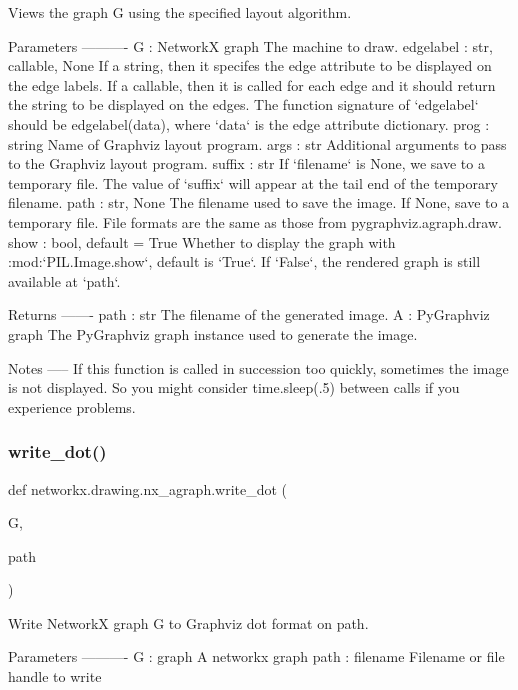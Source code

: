 \begin{DoxyVerb}Views the graph G using the specified layout algorithm.

Parameters
----------
G : NetworkX graph
    The machine to draw.
edgelabel : str, callable, None
    If a string, then it specifes the edge attribute to be displayed
    on the edge labels. If a callable, then it is called for each
    edge and it should return the string to be displayed on the edges.
    The function signature of `edgelabel` should be edgelabel(data),
    where `data` is the edge attribute dictionary.
prog : string
    Name of Graphviz layout program.
args : str
    Additional arguments to pass to the Graphviz layout program.
suffix : str
    If `filename` is None, we save to a temporary file.  The value of
    `suffix` will appear at the tail end of the temporary filename.
path : str, None
    The filename used to save the image.  If None, save to a temporary
    file.  File formats are the same as those from pygraphviz.agraph.draw.
show : bool, default = True
    Whether to display the graph with :mod:`PIL.Image.show`,
    default is `True`. If `False`, the rendered graph is still available
    at `path`.

Returns
-------
path : str
    The filename of the generated image.
A : PyGraphviz graph
    The PyGraphviz graph instance used to generate the image.

Notes
-----
If this function is called in succession too quickly, sometimes the
image is not displayed. So you might consider time.sleep(.5) between
calls if you experience problems.\end{DoxyVerb}
 \mbox{\label{namespacenetworkx_1_1drawing_1_1nx__agraph_a6ee401580d5f709da9ade2cb063e822b}} 
\subsubsection{\texorpdfstring{write\+\_\+dot()}{write\_dot()}}
{\footnotesize\ttfamily def networkx.\+drawing.\+nx\+\_\+agraph.\+write\+\_\+dot (\begin{DoxyParamCaption}\item[{}]{G,  }\item[{}]{path }\end{DoxyParamCaption})}

\begin{DoxyVerb}Write NetworkX graph G to Graphviz dot format on path.

Parameters
----------
G : graph
   A networkx graph
path : filename
   Filename or file handle to write
\end{DoxyVerb}
 